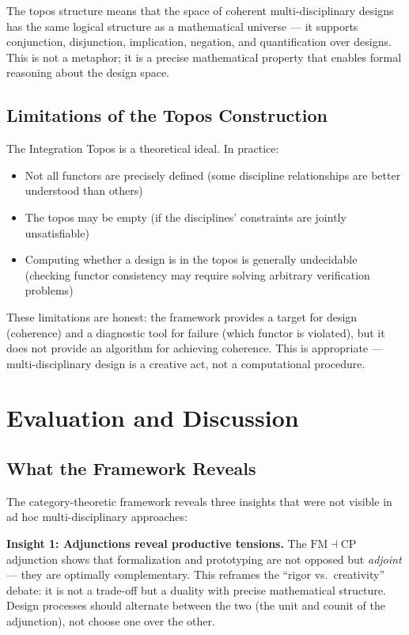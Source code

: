 \documentclass[11pt,a4paper]{article}
\begin{document}
The topos structure means that the space of coherent multi-disciplinary designs has the same logical structure as a mathematical universe --- it supports conjunction, disjunction, implication, negation, and quantification over designs. This is not a metaphor; it is a precise mathematical property that enables formal reasoning about the design space.

\subsection{Limitations of the Topos Construction}

The Integration Topos is a theoretical ideal. In practice:
\begin{itemize}
    \item Not all functors are precisely defined (some discipline relationships are better understood than others)
    \item The topos may be empty (if the disciplines' constraints are jointly unsatisfiable)
    \item Computing whether a design is in the topos is generally undecidable (checking functor consistency may require solving arbitrary verification problems)
\end{itemize}

These limitations are honest: the framework provides a target for design (coherence) and a diagnostic tool for failure (which functor is violated), but it does not provide an algorithm for achieving coherence. This is appropriate --- multi-disciplinary design is a creative act, not a computational procedure.

\section{Evaluation and Discussion}

\subsection{What the Framework Reveals}

The category-theoretic framework reveals three insights that were not visible in ad hoc multi-disciplinary approaches:

\textbf{Insight 1: Adjunctions reveal productive tensions.} The $\mathrm{FM} \dashv \mathrm{CP}$ adjunction shows that formalization and prototyping are not opposed but \emph{adjoint} --- they are optimally complementary. This reframes the ``rigor vs.\ creativity'' debate: it is not a trade-off but a duality with precise mathematical structure. Design processes should alternate between the two (the unit and counit of the adjunction), not choose one over the other.
\end{document}
